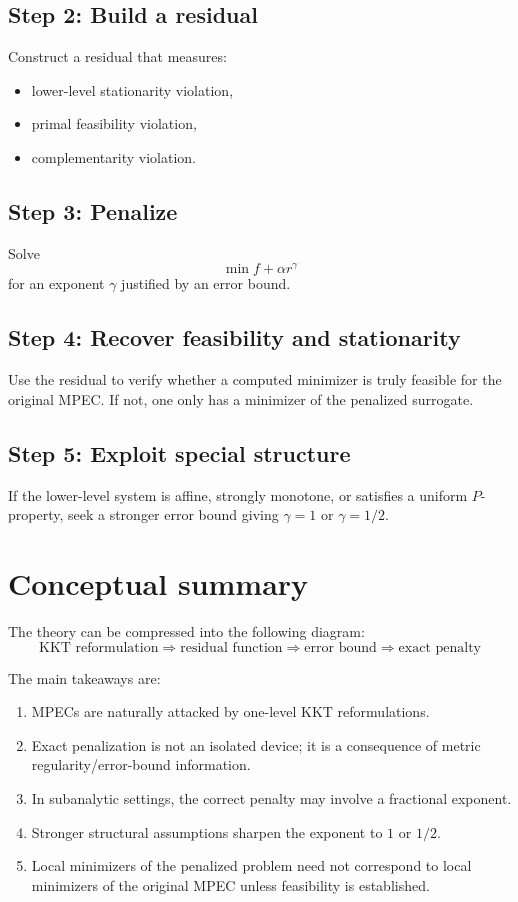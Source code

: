 \documentclass[pdflatex,sn-mathphys-num]{sn-jnl}%
\theoremstyle{definition}
\begin{document}
\subsection*{Step 2: Build a residual}
Construct a residual that measures:
\begin{itemize}
    \item lower-level stationarity violation,
    \item primal feasibility violation,
    \item complementarity violation.
\end{itemize}

\subsection*{Step 3: Penalize}
Solve
\[
\min f+\alpha r^\gamma
\]
for an exponent $\gamma$ justified by an error bound.

\subsection*{Step 4: Recover feasibility and stationarity}
Use the residual to verify whether a computed minimizer is truly feasible for the original MPEC. If not, one only has a minimizer of the penalized surrogate.

\subsection*{Step 5: Exploit special structure}
If the lower-level system is affine, strongly monotone, or satisfies a uniform $P$-property, seek a stronger error bound giving $\gamma=1$ or $\gamma=1/2$.

\section{Conceptual summary}

The theory can be compressed into the following diagram:
\[
\boxed{
\text{KKT reformulation}
\Longrightarrow
\text{residual function}
\Longrightarrow
\text{error bound}
\Longrightarrow
\text{exact penalty}
}
\]

The main takeaways are:

\begin{enumerate}[label=(\roman*)]
    \item MPECs are naturally attacked by one-level KKT reformulations.
    \item Exact penalization is not an isolated device; it is a consequence of metric regularity/error-bound information.
    \item In subanalytic settings, the correct penalty may involve a fractional exponent.
    \item Stronger structural assumptions sharpen the exponent to $1$ or $1/2$.
    \item Local minimizers of the penalized problem need not correspond to local minimizers of the original MPEC unless feasibility is established.
\end{enumerate}
\end{document}
